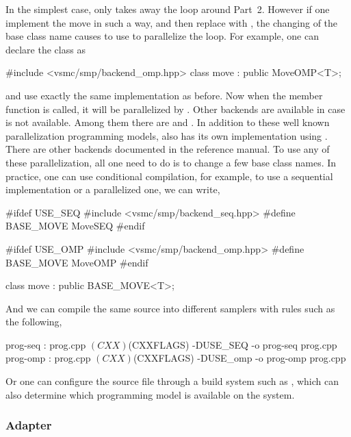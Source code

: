 In the simplest case,  only takes away the loop around
Part~2. However if one implement the move in such a way, and then replace
 with , the changing of the base class
name causes \vsmc to use \openmp to parallelize the loop. For example, one can
declare the class as
\begin{cppcode}
#include <vsmc/smp/backend_omp.hpp>
class move : public MoveOMP<T>;
\end{cppcode}
and use exactly the same implementation as before. Now when the member
function  is called, it will be parallelized by
\openmp. Other backends are available in case \openmp is not available. Among
them there are \cilk and \tbb. In addition to these well known parallelization
programming models, \vsmc also has its own implementation using \cppoo{}
. There are other backends documented in the reference
manual. To use any of these parallelization, all one need to do is to change a
few base class names. In practice, one can use conditional compilation, for
example, to use a sequential implementation or a \openmp parallelized one, we
can write,
\begin{cppcode}
#ifdef USE_SEQ
#include <vsmc/smp/backend_seq.hpp>
#define BASE_MOVE MoveSEQ
#endif

#ifdef USE_OMP
#include <vsmc/smp/backend_omp.hpp>
#define BASE_MOVE MoveOMP
#endif

class move : public BASE_MOVE<T>;
\end{cppcode}
And we can compile the same source into different samplers with
 rules such as the following,
\begin{makecode}
prog-seq : prog.cpp
        $(CXX) $(CXXFLAGS) -DUSE_SEQ -o prog-seq prog.cpp
prog-omp : prog.cpp
        $(CXX) $(CXXFLAGS) -DUSE_omp -o prog-omp prog.cpp
\end{makecode}
Or one can configure the source file through a build system such as \cmake,
which can also determine which programming model is available on the system.

\subsubsection{Adapter}
\label{ssub:Adapter}

